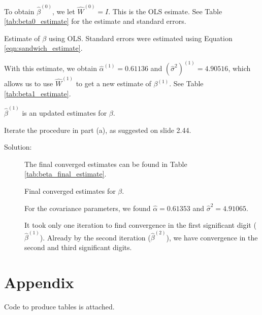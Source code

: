 \documentclass[11pt, letterpaper]{article}
\begin{document}
\begin{enumerate}[(a)]
\begin{description}
  To obtain $\hat{\beta}^{(0)}$, we let $\hat{W}^{(0)} = I$. This is the OLS
  esimate. See Table \ref{tab:beta0_estimate} for the estimate and standard
  errors.
  
  \begin{table}
    \centering
    
    \caption{Estimate of $\beta$ using OLS. Standard errors were estimated using
      Equation \ref{eqn:sandwich_estimate}.}
    \label{tab:beta0_estimate}
  \end{table}

  With this estimate, we obtain $\hat{\alpha}^{(1)} = 0.61136$ and
  $\left(\hat{\sigma}^2\right)^{(1)} = 4.90516$, which allows us to use
  $\hat{W}^{(1)}$ to get a new estimate of $\beta^{(1)}$. See Table
  \ref{tab:beta1_estimate}.

  \begin{table}
    \centering
    
    \caption{$\hat{\beta}^{(1)}$ is an updated estimates for $\beta$.}
    \label{tab:beta1_estimate}
  \end{table}  
  
  
\end{description}


{\em \item Iterate the procedure in part (a), as suggested on slide 2.44.}

\begin{description}
\item[Solution:] The final converged estimates can be found in Table
  \ref{tab:beta_final_estimate}.
  \begin{table}[!ht]
    \centering
    
    \caption{Final converged estimates for $\beta$.}
    \label{tab:beta_final_estimate}
  \end{table}

  For the covariance parameters, we found $\hat{\alpha} = 0.61353$ and
  $\hat{\sigma}^2 = 4.91065$.

  It took only one iteration to find convergence in the first significant digit
  ($\hat{\beta}^{(1)}$). Already by the second iteration ($\hat{\beta}^{(2)}$),
  we have convergence in the second and third significant digits.
\end{description}
\end{enumerate}

\pagebreak
\section*{Appendix}

Code to produce tables is attached.

\pagebreak


\end{document}
